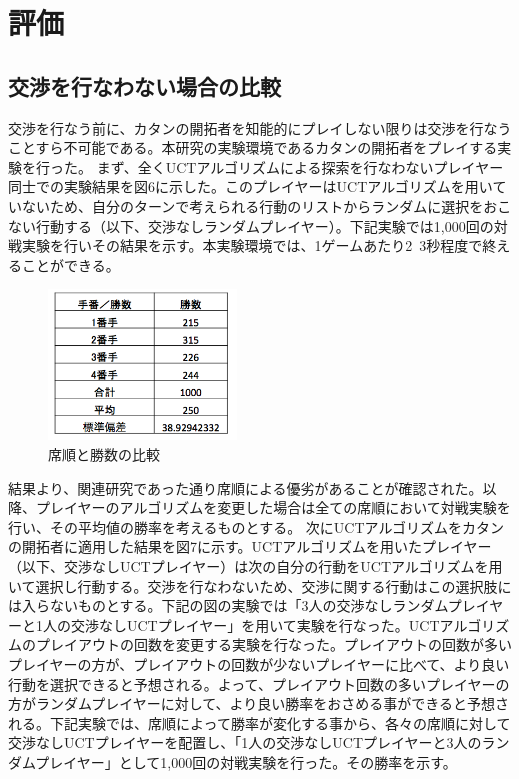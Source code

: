 \documentclass[a4, 10pt,dvipdfmx]{jsarticle}
\begin{document}
\section{評価}
\subsection{交渉を行なわない場合の比較}
交渉を行なう前に、カタンの開拓者を知能的にプレイしない限りは交渉を行なうことすら不可能である。本研究の実験環境であるカタンの開拓者をプレイする実験を行った。
まず、全くUCTアルゴリズムによる探索を行なわないプレイヤー同士での実験結果を図6に示した。このプレイヤーはUCTアルゴリズムを用いていないため、自分のターンで考えられる行動のリストからランダムに選択をおこない行動する（以下、交渉なしランダムプレイヤー）。下記実験では1,000回の対戦実験を行いその結果を示す。本実験環境では、1ゲームあたり2~3秒程度で終えることができる。
\begin{figure}[b]
    \begin{center}
      \includegraphics[width=50mm]{img/arrangement.png}
    \end{center}
    \caption{席順と勝数の比較}
    \label{arrangement}
\end{figure}

結果より、関連研究であった通り\cite{SmartSettlers}席順による優劣があることが確認された。以降、プレイヤーのアルゴリズムを変更した場合は全ての席順において対戦実験を行い、その平均値の勝率を考えるものとする。 
次にUCTアルゴリズムをカタンの開拓者に適用した結果を図7に示す。UCTアルゴリズムを用いたプレイヤー（以下、交渉なしUCTプレイヤー）は次の自分の行動をUCTアルゴリズムを用いて選択し行動する。交渉を行なわないため、交渉に関する行動はこの選択肢には入らないものとする。下記の図の実験では「3人の交渉なしランダムプレイヤーと1人の交渉なしUCTプレイヤー」を用いて実験を行なった。UCTアルゴリズムのプレイアウトの回数を変更する実験を行なった。プレイアウトの回数が多いプレイヤーの方が、プレイアウトの回数が少ないプレイヤーに比べて、より良い行動を選択できると予想される。よって、プレイアウト回数の多いプレイヤーの方がランダムプレイヤーに対して、より良い勝率をおさめる事ができると予想される。下記実験では、席順によって勝率が変化する事から、各々の席順に対して交渉なしUCTプレイヤーを配置し、「1人の交渉なしUCTプレイヤーと3人のランダムプレイヤー」として1,000回の対戦実験を行った。その勝率を示す。
\end{document}
